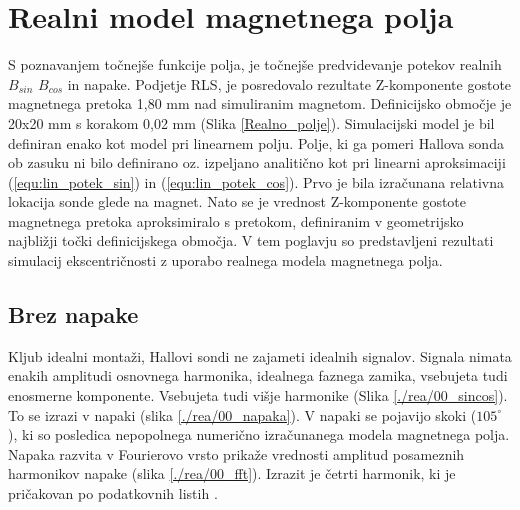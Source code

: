 \chapter{Realni model magnetnega polja}
S poznavanjem točnejše funkcije polja, je točnejše predvidevanje potekov realnih $B_{sin}$ $B_{cos}$ in napake. Podjetje RLS,  je posredovalo rezultate Z-komponente gostote magnetnega pretoka 1,80 mm nad simuliranim magnetom.  Definicijsko območje  je 20x20 mm s korakom 0,02 mm (Slika \ref{Realno_polje}).
Simulacijski model je bil definiran enako kot model pri linearnem polju.
Polje, ki ga pomeri Hallova sonda ob zasuku ni bilo definirano oz. izpeljano analitično kot pri linearni aproksimaciji (\ref{equ:lin_potek_sin}) in (\ref{equ:lin_potek_cos}).  Prvo je bila izračunana relativna lokacija sonde glede na magnet. Nato se je vrednost Z-komponente gostote magnetnega pretoka  aproksimiralo s pretokom, definiranim v geometrijsko najbližji točki definicijskega območja. V tem poglavju so predstavljeni rezultati simulacij ekscentričnosti z uporabo realnega modela magnetnega polja.
\section{Brez napake}
Kljub idealni montaži, Hallovi sondi ne zajameti idealnih signalov. Signala nimata enakih amplitudi osnovnega harmonika, idealnega faznega zamika, vsebujeta tudi enosmerne komponente. Vsebujeta tudi višje harmonike (Slika \ref{./rea/00_sincos}). To se izrazi v napaki (slika \ref{./rea/00_napaka}). V napaki se pojavijo skoki ($105^{\circ}$ ), ki so posledica nepopolnega numerično izračunanega modela magnetnega polja. Napaka razvita v Fourierovo vrsto prikaže vrednosti amplitud posameznih harmonikov napake (slika \ref{./rea/00_fft}). Izrazit je četrti harmonik, ki je pričakovan po podatkovnih listih \cite{AM8192}.
\newpage
